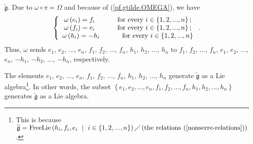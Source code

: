 \documentclass[etingof-lie.tex]{subfiles}
\begin{document}
\begin{verlong}
$\widetilde{\mathfrak{g}}$. Due to $\omega\circ\pi=\Omega$ and because of
(\ref{pf.gtilde.OMEGA}), we have%
\begin{equation}
\left\{
\begin{array}
[c]{c}%
\omega\left(  e_{i}\right)  =f_{i}\ \ \ \ \ \ \ \ \ \ \text{for every }%
i\in\left\{  1,2,...,n\right\}  ;\\
\omega\left(  f_{i}\right)  =e_{i}\ \ \ \ \ \ \ \ \ \ \text{for every }%
i\in\left\{  1,2,...,n\right\}  ;\\
\omega\left(  h_{i}\right)  =-h_{i}\ \ \ \ \ \ \ \ \ \ \text{for every }%
i\in\left\{  1,2,...,n\right\}
\end{array}
\right.  . \label{pf.gtilde.omega}%
\end{equation}
Thus, $\omega$ sends $e_{1}$, $e_{2}$, $...$, $e_{n}$, $f_{1}$, $f_{2}$,
$...$, $f_{n}$, $h_{1}$, $h_{2}$, $...$, $h_{n}$ to $f_{1}$, $f_{2}$, $...$,
$f_{n}$, $e_{1}$, $e_{2}$, $...$, $e_{n}$, $-h_{1}$, $-h_{2}$, $...$, $-h_{n}%
$, respectively.

The elements $e_{1}$, $e_{2}$, $...$, $e_{n}$, $f_{1}$, $f_{2}$, $...$,
$f_{n}$, $h_{1}$, $h_{2}$, $...$, $h_{n}$ generate $\widetilde{\mathfrak{g}}$
as a Lie algebra\footnote{This is because $\widetilde{\mathfrak{g}%
}=\operatorname*{FreeLie}\left(  h_{i},f_{i},e_{i}\ \mid\ i\in\left\{
1,2,...,n\right\}  \right)  \diagup\left(  \text{the relations
(\ref{nonserre-relations})}\right)  $.}. In other words, the subset $\left\{
e_{1},e_{2},...,e_{n},f_{1},f_{2},...,f_{n},h_{1},h_{2},...,h_{n}\right\}  $
generates $\widetilde{\mathfrak{g}}$ as a Lie algebra.


\end{verlong}
\end{document}
